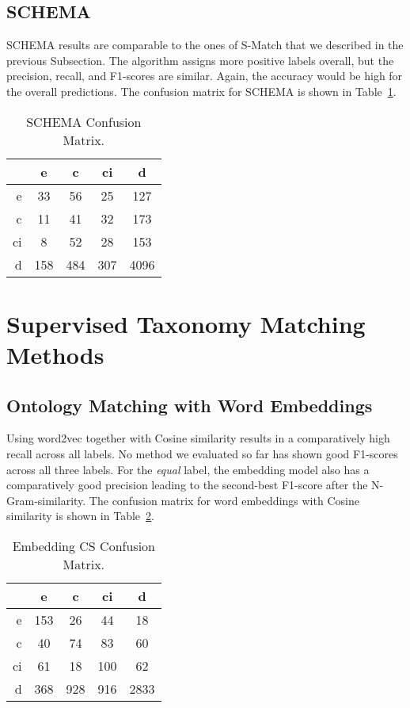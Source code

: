 \subsection{SCHEMA}

SCHEMA results are comparable to the ones of S-Match that we described in the previous Subsection.
The algorithm assigns more positive labels overall, but the  precision, recall, and F1-scores are similar.
Again, the accuracy would be high for the overall predictions.
The confusion matrix for SCHEMA is shown in Table~\ref{tab:schema-cm}.

\begin{table}[htbp]
 \begin{center}
  \begin{tabular}{r|cccc}
   & e & c & ci & d \\
   \hline
   e & 33 & 56 & 25 & 127 \\
   c & 11 & 41 & 32 & 173 \\
   ci & 8 & 52 & 28 & 153 \\
   d & 158 & 484 & 307 & 4096 \\
  \end{tabular}
  \caption{SCHEMA Confusion Matrix.}
  \label{tab:schema-cm}
 \end{center}
\end{table}

\section{Supervised Taxonomy Matching Methods}

\subsection{Ontology Matching with Word Embeddings}

Using word2vec together with Cosine similarity results in a comparatively high recall across all labels.
No method we evaluated so far has shown good F1-scores across all three labels.
For the \emph{equal} label, the embedding model also has a comparatively good precision leading to the second-best F1-score after the
N-Gram-similarity.
The confusion matrix for word embeddings with Cosine similarity is shown in Table~\ref{tab:embedding-css-cm}.

\begin{table}[htbp]
 \begin{center}
  \begin{tabular}{r|cccc}
   & e & c & ci & d \\
   \hline
   e & 153 & 26 & 44 & 18 \\
   c & 40 & 74 & 83 & 60 \\
   ci & 61 & 18 & 100 & 62 \\
   d & 368 & 928 & 916 & 2833 \\
  \end{tabular}
  \caption{Embedding CS Confusion Matrix.}
  \label{tab:embedding-css-cm}
 \end{center}
\end{table}

